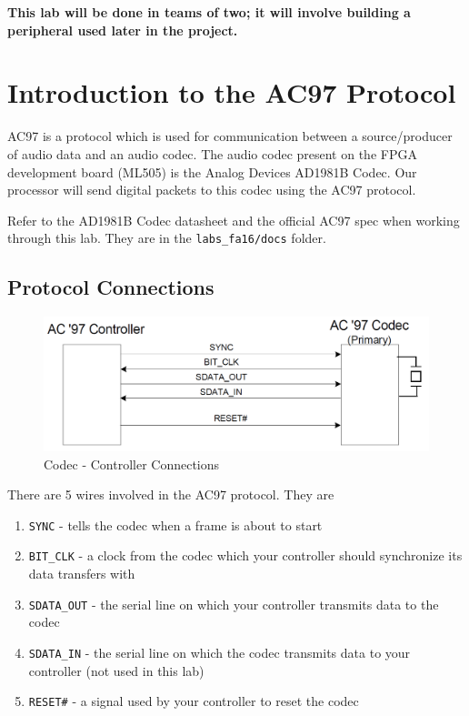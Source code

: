 \documentclass[11pt]{article}
\begin{document}
\textbf{This lab will be done in teams of two; it will involve building a peripheral used later in the project.}

\section{Introduction to the AC97 Protocol}
AC97 is a protocol which is used for communication between a source/producer of audio data and an audio codec. The audio codec present on the FPGA development board (ML505) is the Analog Devices AD1981B Codec. Our processor will send digital packets to this codec using the AC97 protocol.

Refer to the AD1981B Codec datasheet and the official AC97 spec when working through this lab. They are in the \verb|labs_fa16/docs| folder.

\subsection{Protocol Connections}

\begin{figure}[H]
	\begin{center}
		\includegraphics[width=6in]{ac97_connections}
		\caption{Codec - Controller Connections}
	\end{center}
\end{figure}

There are 5 wires involved in the AC97 protocol. They are

\begin{enumerate}
	\item \verb|SYNC| - tells the codec when a frame is about to start
	\item \verb|BIT_CLK| - a clock from the codec which your controller should synchronize its data transfers with
	\item \verb|SDATA_OUT| - the serial line on which your controller transmits data to the codec
	\item \verb|SDATA_IN| - the serial line on which the codec transmits data to your controller (not used in this lab)
	\item \verb|RESET#| - a signal used by your controller to reset the codec
\end{enumerate}
\end{document}
